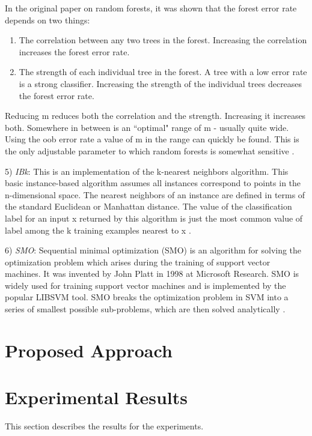 \documentclass[conference]{IEEEtran}
\begin{document}
In the original paper on random forests, it was shown that the forest error rate depends on two things:

\begin{enumerate}
\item The correlation between any two trees in the forest. Increasing the correlation increases the forest error rate.
\item The strength of each individual tree in the forest. A tree with a low error rate is a strong classifier. Increasing the strength of the individual trees decreases the forest error rate.
\end{enumerate}

Reducing m reduces both the correlation and the strength. Increasing it increases both. Somewhere in between is an ``optimal" range of m - usually quite wide. Using the oob error rate a value of m in the range can quickly be found. This is the only adjustable parameter to which random forests is somewhat sensitive \cite{breiman}.

5) \textit{IBk}: This is an implementation of the k-nearest neighbors algorithm. This basic instance-based algorithm assumes all instances correspond to points in the n-dimensional space. The nearest neighbors of an instance are defined in terms of the standard Euclidean or Manhattan distance. The value of the classification label for an input x returned by this algorithm is just the most common value of label among the k training examples nearest to x \cite{Mitchell}.

6) \textit{SMO}: Sequential minimal optimization (SMO) is an algorithm for solving the optimization problem which arises during the training of support vector machines. It was invented by John Platt in 1998 at Microsoft Research. SMO is widely used for training support vector machines and is implemented by the popular LIBSVM tool. SMO breaks the optimization problem in SVM into a series of smallest possible sub-problems, which are then solved analytically \cite{smo}.

\section{Proposed Approach}

\section{Experimental Results}

This section describes the results for the experiments.
\end{document}
